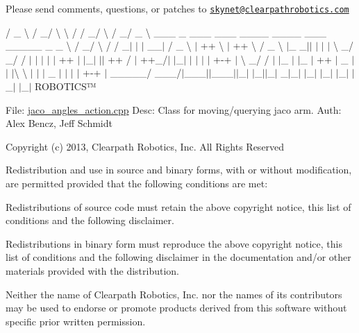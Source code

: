 Please send comments, questions, or patches to \href{mailto:skynet@clearpathrobotics.com}{\tt skynet@clearpathrobotics.\+com}



 / \+\_\+ \textbackslash{} / \+\_\+/ \textbackslash{} \textbackslash{} / / \+\_\+/ \textbackslash{} / \+\_\+/ \+\_\+ \textbackslash{} \+\_\+\+\_\+\+\_\+ \+\_\+ \+\_\+\+\_\+\+\_\+ \+\_\+\+\_\+\+\_\+ \+\_\+\+\_\+\+\_\+\+\_\+ \+\_\+\+\_\+\+\_\+\+\_\+ \+\_\+\+\_\+\+\_\+ \+\_\+\+\_\+\+\_\+\+\_\+\+\_\+ \+\_\+ \+\_\+ \textbackslash{} / \+\_\+/ \textbackslash{} / / \+\_\+$|$ $\vert$ $\vert$ \+\_\+\+\_\+$\vert$ / \+\_\+ \textbackslash{} $\vert$ ++ \textbackslash{} $\vert$ ++ \textbackslash{} / \+\_\+ \textbackslash{} $\vert$\+\_\+ \+\_\+$\vert$$\vert$ $\vert$ $\vert$ $\vert$ \textbackslash{} \+\_\+/ \+\_\+/ / $\vert$ $\vert$ $\vert$ $\vert$ $\vert$ ++ $\vert$ $\vert$\+\_\+$\vert$ $\vert$$\vert$ ++ / $\vert$ ++\+\_\+/$\vert$ $\vert$\+\_\+$\vert$ $\vert$ $\vert$ $\vert$ $\vert$ +-\/+ $\vert$ \textbackslash{} \+\_\+/ / $\vert$ $\vert$\+\_\+ $\vert$ $\vert$\+\_\+ $\vert$ ++ $\vert$ \+\_\+ $\vert$$\vert$ $\vert$\textbackslash{} \textbackslash{} $\vert$ $\vert$ $\vert$ \+\_\+ $\vert$ $\vert$ $\vert$ $\vert$ +-\/+ $\vert$ \+\_\+\+\_\+\+\_\+\+\_\+\+\_\+/ \+\_\+\+\_\+\+\_\+/$\vert$\+\_\+\+\_\+\+\_\+$\vert$$\vert$\+\_\+\+\_\+\+\_\+$\vert$$\vert$\+\_\+$\vert$ $\vert$\+\_\+$\vert$$\vert$\+\_\+$\vert$ \+\_\+$|$\+\_\+$\vert$ $\vert$\+\_\+$\vert$ $\vert$\+\_\+$\vert$ $\vert$\+\_\+$\vert$ $\vert$\+\_\+$\vert$ $\vert$\+\_\+$\vert$ R\+O\+B\+O\+T\+I\+C\+S™

File\+: \hyperlink{jaco__angles__action_8cpp}{jaco\+\_\+angles\+\_\+action.\+cpp} Desc\+: Class for moving/querying jaco arm. Auth\+: Alex Bencz, Jeff Schmidt

Copyright (c) 2013, Clearpath Robotics, Inc. All Rights Reserved

Redistribution and use in source and binary forms, with or without modification, are permitted provided that the following conditions are met\+:
\begin{DoxyItemize}
\item Redistributions of source code must retain the above copyright notice, this list of conditions and the following disclaimer.
\item Redistributions in binary form must reproduce the above copyright notice, this list of conditions and the following disclaimer in the documentation and/or other materials provided with the distribution.
\item Neither the name of Clearpath Robotics, Inc. nor the names of its contributors may be used to endorse or promote products derived from this software without specific prior written permission.
\end{DoxyItemize}

